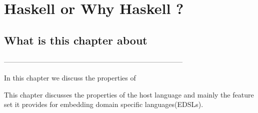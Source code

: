 \documentclass[thesis-solanki.tex]{subfiles}
\begin{document}
\chapter{Haskell or Why Haskell ?}\label{chap:hwh}


\section{What is this chapter about}

-----------------------------------------------------------------------------


In this chapter we discuss the properties of  

\par This chapter discusses the properties of the host language  and mainly the feature set it provides for embedding 
domain specific languages(EDSLs).
\end{document}
